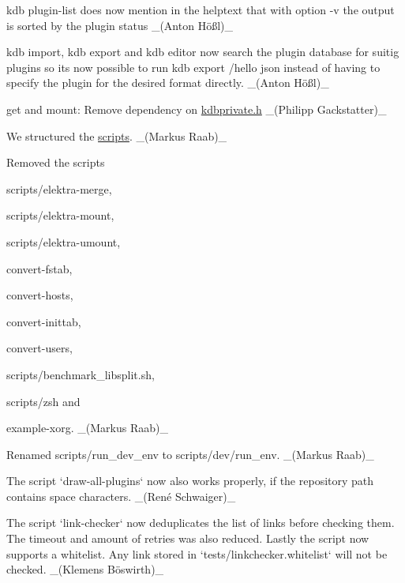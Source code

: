 \begin{DoxyItemize}
\item {\ttfamily kdb plugin-\/list} does now mention in the helptext that with option {\ttfamily -\/v} the output is sorted by the plugin status \+\_\+(Anton Hößl)\+\_\+
\item {\ttfamily kdb import}, {\ttfamily kdb export} and {\ttfamily kdb editor} now search the plugin database for suitig plugins so it\textquotesingle{}s now possible to run {\ttfamily kdb export /hello json} instead of having to specify the plugin for the desired format directly. \+\_\+(Anton Hößl)\+\_\+
\item {\ttfamily get} and {\ttfamily mount}\+: Remove dependency on {\ttfamily \hyperlink{kdbprivate_8h}{kdbprivate.\+h}} \+\_\+(\+Philipp Gackstatter)\+\_\+
\end{DoxyItemize}


\begin{DoxyItemize}
\item We structured the \hyperlink{scripts_README_md}{scripts}. \+\_\+(\+Markus Raab)\+\_\+
\item Removed the scripts
\begin{DoxyItemize}
\item {\ttfamily scripts/elektra-\/merge},
\item {\ttfamily scripts/elektra-\/mount},
\item {\ttfamily scripts/elektra-\/umount},
\item {\ttfamily convert-\/fstab},
\item {\ttfamily convert-\/hosts},
\item {\ttfamily convert-\/inittab},
\item {\ttfamily convert-\/users},
\item {\ttfamily scripts/benchmark\+\_\+libsplit.\+sh},
\item {\ttfamily scripts/zsh} and
\item {\ttfamily example-\/xorg}. \+\_\+(\+Markus Raab)\+\_\+
\end{DoxyItemize}
\item Renamed {\ttfamily scripts/run\+\_\+dev\+\_\+env} to {\ttfamily scripts/dev/run\+\_\+env}. \+\_\+(\+Markus Raab)\+\_\+
\item The script `draw-\/all-\/plugins` now also works properly, if the repository path contains space characters. \+\_\+(René Schwaiger)\+\_\+
\item The script `link-\/checker` now deduplicates the list of links before checking them. The timeout and amount of retries was also reduced. Lastly the script now supports a whitelist. Any link stored in `tests/linkchecker.whitelist` will not be checked. \+\_\+(Klemens Böswirth)\+\_\+

\end{DoxyItemize}
